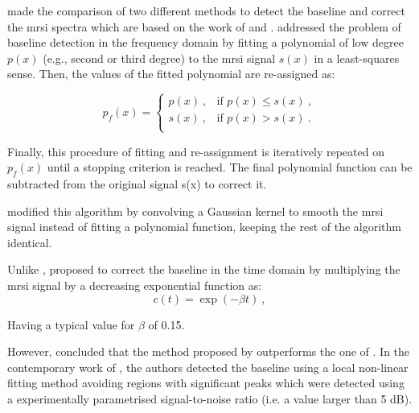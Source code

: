 \begin{enumerate}[leftmargin=*]
\cite{Parfait2012} made the comparison of two different methods to detect the baseline and correct the \ac{mrsi} spectra which are based on the work of \cite{Lieber2003} and \cite{Devos2004}. \cite{Lieber2003} addressed the problem of baseline detection in the frequency domain by fitting a polynomial of low degree $p(x)$ (e.g., second or third degree) to the \ac{mrsi} signal $s(x)$ in a least-squares sense. Then, the values of the fitted polynomial are re-assigned as:

\begin{equation}
	p_f(x) = 
	\begin{cases}
		p(x) \ , & \text{if $p(x) \leq s(x)$} \ , \\
		s(x) \ , & \text{if $p(x) > s(x)$} \ . \\
	\end{cases}
	\label{eq:lieber}
\end{equation}

Finally, this procedure of fitting and re-assignment is iteratively repeated on $p_f(x)$ until a stopping criterion is reached. The final polynomial function can be subtracted from the original signal s(x) to correct it.

\cite{Parfait2012} modified this algorithm by convolving a Gaussian kernel to smooth the \ac{mrsi} signal instead of fitting a polynomial function, keeping the rest of the algorithm identical. 

Unlike \cite{Lieber2003}, \cite{Devos2004} proposed to correct the baseline in the time domain by multiplying the \ac{mrsi} signal by a decreasing exponential function as:
\begin{equation}
	c(t) = \exp (- \beta t) \ ,
	\label{eq:devos}
\end{equation}

\noindent Having a typical value for $\beta$ of 0.15.

However, \cite{Parfait2012} concluded that the method proposed by \cite{Lieber2003} outperforms the one of \cite{Devos2004}. In the contemporary work of \cite{Tiwari2012}, the authors detected the baseline using a local non-linear fitting method avoiding regions with significant peaks which were  detected using a experimentally parametrised signal-to-noise ratio (i.e. a value larger than 5 dB).


\end{enumerate}

